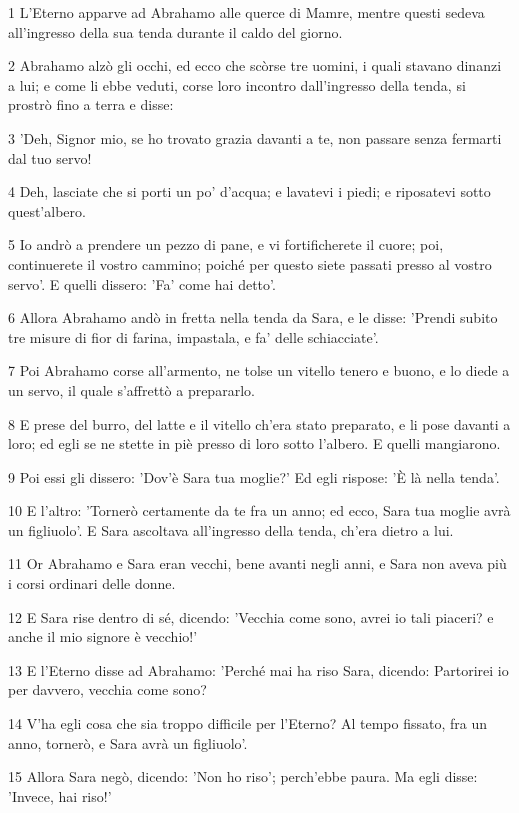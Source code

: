 \par 1 L'Eterno apparve ad Abrahamo alle querce di Mamre, mentre questi sedeva all'ingresso della sua tenda durante il caldo del giorno.
\par 2 Abrahamo alzò gli occhi, ed ecco che scòrse tre uomini, i quali stavano dinanzi a lui; e come li ebbe veduti, corse loro incontro dall'ingresso della tenda, si prostrò fino a terra e disse:
\par 3 'Deh, Signor mio, se ho trovato grazia davanti a te, non passare senza fermarti dal tuo servo!
\par 4 Deh, lasciate che si porti un po' d'acqua; e lavatevi i piedi; e riposatevi sotto quest'albero.
\par 5 Io andrò a prendere un pezzo di pane, e vi fortificherete il cuore; poi, continuerete il vostro cammino; poiché per questo siete passati presso al vostro servo'. E quelli dissero: 'Fa' come hai detto'.
\par 6 Allora Abrahamo andò in fretta nella tenda da Sara, e le disse: 'Prendi subito tre misure di fior di farina, impastala, e fa' delle schiacciate'.
\par 7 Poi Abrahamo corse all'armento, ne tolse un vitello tenero e buono, e lo diede a un servo, il quale s'affrettò a prepararlo.
\par 8 E prese del burro, del latte e il vitello ch'era stato preparato, e li pose davanti a loro; ed egli se ne stette in piè presso di loro sotto l'albero. E quelli mangiarono.
\par 9 Poi essi gli dissero: 'Dov'è Sara tua moglie?' Ed egli rispose: 'È là nella tenda'.
\par 10 E l'altro: 'Tornerò certamente da te fra un anno; ed ecco, Sara tua moglie avrà un figliuolo'. E Sara ascoltava all'ingresso della tenda, ch'era dietro a lui.
\par 11 Or Abrahamo e Sara eran vecchi, bene avanti negli anni, e Sara non aveva più i corsi ordinari delle donne.
\par 12 E Sara rise dentro di sé, dicendo: 'Vecchia come sono, avrei io tali piaceri? e anche il mio signore è vecchio!'
\par 13 E l'Eterno disse ad Abrahamo: 'Perché mai ha riso Sara, dicendo: Partorirei io per davvero, vecchia come sono?
\par 14 V'ha egli cosa che sia troppo difficile per l'Eterno? Al tempo fissato, fra un anno, tornerò, e Sara avrà un figliuolo'.
\par 15 Allora Sara negò, dicendo: 'Non ho riso'; perch'ebbe paura. Ma egli disse: 'Invece, hai riso!'
